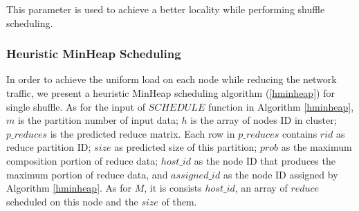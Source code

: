 This parameter is used to achieve a better locality while performing shuffle scheduling.

\subsubsection{Heuristic MinHeap Scheduling}\label{h-minheap}
In order to achieve the uniform load on each node while reducing the network traffic, we present a heuristic MinHeap scheduling algorithm (\ref{hminheap}) for single shuffle.  
As for the input of $SCHEDULE$ function in Algorithm \ref{hminheap}, $m$ is the partition number of input data; $h$ is the array of nodes ID in cluster; $p\_reduces$ is the predicted reduce matrix. Each row in $p\_reduces$ contains $rid$ as reduce partition ID; $size$ as predicted size of this partition; $prob$ as the maximum composition portion of reduce data; $host\_id$ as the node ID that produces the maximum portion of reduce data, and $assigned\_id$ as the node ID assigned by Algorithm \ref{hminheap}. As for $M$, it is consists $host\_id$, an array of $reduce$ scheduled on this node and the $size$ of them.

